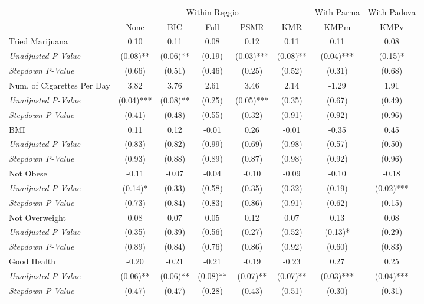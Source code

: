 \begin{tabular}{l c c c c c c c}
\toprule
& \multicolumn{5}{c}{Within Reggio} & With Parma & With Padova \\\cmidrule(lr){2-6} \cmidrule(lr){7-7} \cmidrule(lr){8-8}
 & None & BIC & Full & PSMR & KMR & KMPm & KMPv \\
\midrule
Tried Marijuana & 0.10 & 0.11 & 0.08 & 0.12 & 0.11 & 0.11 & 0.08 \\
\quad \textit{Unadjusted P-Value} & (0.08)** & (0.06)** & (0.19) & (0.03)*** & (0.08)** & (0.04)*** & (0.15)* \\
\quad \textit{Stepdown P-Value} & (0.66) & (0.51) & (0.46) & (0.25) & (0.52) & (0.31) & (0.68) \\
Num. of Cigarettes Per Day & 3.82 & 3.76 & 2.61 & 3.46 & 2.14 & -1.29 & 1.91 \\
\quad \textit{Unadjusted P-Value} & (0.04)*** & (0.08)** & (0.25) & (0.05)*** & (0.35) & (0.67) & (0.49) \\
\quad \textit{Stepdown P-Value} & (0.41) & (0.48) & (0.55) & (0.32) & (0.91) & (0.92) & (0.96) \\
BMI & 0.11 & 0.12 & -0.01 & 0.26 & -0.01 & -0.35 & 0.45 \\
\quad \textit{Unadjusted P-Value} & (0.83) & (0.82) & (0.99) & (0.69) & (0.98) & (0.57) & (0.50) \\
\quad \textit{Stepdown P-Value} & (0.93) & (0.88) & (0.89) & (0.87) & (0.98) & (0.92) & (0.96) \\
Not Obese & -0.11 & -0.07 & -0.04 & -0.10 & -0.09 & -0.10 & -0.18 \\
\quad \textit{Unadjusted P-Value} & (0.14)* & (0.33) & (0.58) & (0.35) & (0.32) & (0.19) & (0.02)*** \\
\quad \textit{Stepdown P-Value} & (0.73) & (0.84) & (0.83) & (0.86) & (0.91) & (0.62) & (0.15) \\
Not Overweight & 0.08 & 0.07 & 0.05 & 0.12 & 0.07 & 0.13 & 0.08 \\
\quad \textit{Unadjusted P-Value} & (0.35) & (0.39) & (0.56) & (0.27) & (0.52) & (0.13)* & (0.29) \\
\quad \textit{Stepdown P-Value} & (0.89) & (0.84) & (0.76) & (0.86) & (0.92) & (0.60) & (0.83) \\
Good Health & -0.20 & -0.21 & -0.21 & -0.19 & -0.23 & 0.27 & 0.25 \\
\quad \textit{Unadjusted P-Value} & (0.06)** & (0.06)** & (0.08)** & (0.07)** & (0.07)** & (0.03)*** & (0.04)*** \\
\quad \textit{Stepdown P-Value} & (0.47) & (0.47) & (0.28) & (0.43) & (0.51) & (0.30) & (0.31) \\

\end{tabular}
